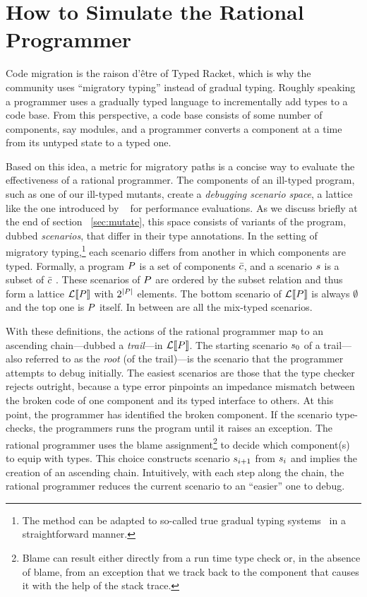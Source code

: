 \section{How to Simulate the Rational Programmer} 

Code migration is the raison d'\^etre of Typed Racket, which is why the community
uses ``migratory typing'' instead of gradual typing. Roughly speaking a
programmer uses a gradually typed language to incrementally add types to a code
base. From this perspective, a code base consists of some number of components,
say modules, and a programmer converts a component at a time from its untyped
state to a typed one. 

Based on this idea, a metric for migratory paths is a concise way to
evaluate the effectiveness of a rational programmer. The components of
an ill-typed program, such as one of  our ill-typed mutants, 
create a \emph{debugging scenario space}, a lattice like
the one introduced by ~\citet{tfgnvf-popl-2016} for performance
evaluations. As we discuss briefly at the end of section ~\ref{sec:mutate}, 
this space consists of variants of the program, dubbed
\emph{scenarios}, that differ in their type annotations. In the
setting of migratory typing,\footnote{The method can be adapted to
so-called true gradual typing systems~\cite{svcb-snapl-2015} in a
straightforward manner.} each scenario differs from another in which
components are typed. Formally, a program $P$ is a set of
components $\bar{c}$, and a scenario $s$ is a subset of
$\bar{c}$ . These scenarios of $P$ are ordered by the
subset relation and thus form a lattice $\mathcal{L}\llbracket P\rrbracket$ with
$2^{\mid P \mid}$ elements.  The bottom scenario of
$\mathcal{L}\llbracket P\rrbracket$ is always $\emptyset$ and the top one is $P$
itself. In between are all the mix-typed scenarios.

With these definitions, the actions of the rational programmer map to
an ascending chain---dubbed a \emph{trail}---in $\mathcal{L}\llbracket P\rrbracket$.
The starting scenario $s_0$ of a trail---also referred to as the
\emph{root} (of the trail)---is the scenario that the programmer
attempts to debug initially. The easiest scenarios are those that the
type checker rejects outright, because a type error pinpoints an
impedance mismatch between the broken code of one component and its
typed interface to others. At this point, the programmer has
identified the broken component. If the scenario type-checks, the
programmers runs the program until it raises an exception.  The
rational programmer uses the blame assignment\footnote{Blame can
result either directly from a run time type check or, in the absence
of blame, from an exception that we track back to the component that
causes it with the help of the stack trace.} to decide which
component(s) to equip with types. This choice constructs scenario
$s_{i+1}$ from $s_{i}$ and implies the creation of an
ascending chain.  Intuitively, with each step along the chain, the
rational programmer reduces the current scenario to an ``easier'' one
to debug.


